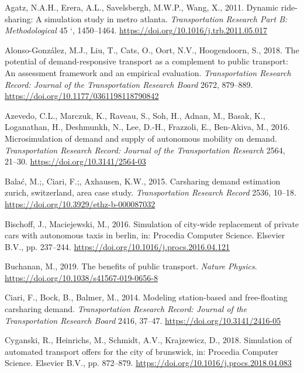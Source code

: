 \documentclass[
]{report}
\newlength{\cslhangindent}
\newlength{\cslentryspacingunit} %
\newenvironment{CSLReferences}[2] %
 {%
  \setlength{\parindent}{0pt}
  \ifodd #1
  \let\oldpar\par
  \def\par{\hangindent=\cslhangindent\oldpar}
  \fi
  \setlength{\parskip}{#2\cslentryspacingunit}
 }%
 {}
\begin{document}
\hypertarget{refs}{}
\begin{CSLReferences}{1}{0}
\leavevmode{}%
Agatz, N.A.H., Erera, A.L., Savelsbergh, M.W.P., Wang, X., 2011. Dynamic ride-sharing: A simulation study in metro atlanta. \emph{Transportation Research Part B: Methodological} 45 `, 1450--1464. \url{https://doi.org/10.1016/j.trb.2011.05.017}

\leavevmode{}%
Alonso-González, M.J., Liu, T., Cats, O., Oort, N.V., Hoogendoorn, S., 2018. The potential of demand-responsive transport as a complement to public transport: An assessment framework and an empirical evaluation. \emph{Transportation Research Record: Journal of the Transportation Research Board} 2672, 879--889. \url{https://doi.org/10.1177/0361198118790842}

\leavevmode{}%
Azevedo, C.L., Marczuk, K., Raveau, S., Soh, H., Adnan, M., Basak, K., Loganathan, H., Deshmunkh, N., Lee, D.-H., Frazzoli, E., Ben-Akiva, M., 2016. Microsimulation of demand and supply of autonomous mobility on demand. \emph{Transportation Research Record: Journal of the Transportation Research} 2564, 21--30. \url{https://doi.org/10.3141/2564-03}

\leavevmode{}%
Balać, M.;, Ciari, F.;, Axhausen, K.W., 2015. Carsharing demand estimation zurich, switzerland, area case study. \emph{Transportation Research Record} 2536, 10--18. \url{https://doi.org/10.3929/ethz-b-000087032}

\leavevmode{}%
Bischoff, J., Maciejewski, M., 2016. Simulation of city-wide replacement of private cars with autonomous taxis in berlin, in: Procedia Computer Science. Elsevier B.V., pp. 237--244. \url{https://doi.org/10.1016/j.procs.2016.04.121}

\leavevmode{}%
Buchanan, M., 2019. The benefits of public transport. \emph{Nature Physics}. \url{https://doi.org/10.1038/s41567-019-0656-8}

\leavevmode{}%
Ciari, F., Bock, B., Balmer, M., 2014. Modeling station-based and free-floating carsharing demand. \emph{Transportation Research Record: Journal of the Transportation Research Board} 2416, 37--47. \url{https://doi.org/10.3141/2416-05}

\leavevmode{}%
Cyganski, R., Heinrichs, M., Schmidt, A.V., Krajzewicz, D., 2018. Simulation of automated transport offers for the city of brunswick, in: Procedia Computer Science. Elsevier B.V., pp. 872--879. \url{https://doi.org/10.1016/j.procs.2018.04.083}


\end{CSLReferences}
\end{document}
